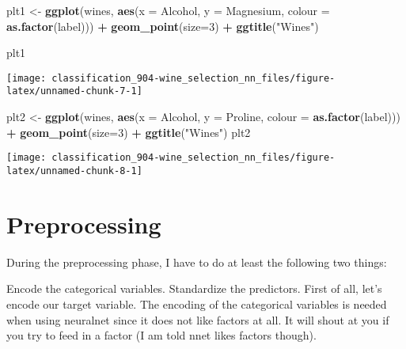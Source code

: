 \documentclass[]{book}
\newenvironment{Shaded}{\begin{snugshade}}{\end{snugshade}}
\newcommand{\DataTypeTok}[1]{\textcolor[rgb]{0.13,0.29,0.53}{#1}}
\newcommand{\DecValTok}[1]{\textcolor[rgb]{0.00,0.00,0.81}{#1}}
\newcommand{\KeywordTok}[1]{\textcolor[rgb]{0.13,0.29,0.53}{\textbf{#1}}}
\newcommand{\NormalTok}[1]{#1}
\newcommand{\OperatorTok}[1]{\textcolor[rgb]{0.81,0.36,0.00}{\textbf{#1}}}
\newcommand{\StringTok}[1]{\textcolor[rgb]{0.31,0.60,0.02}{#1}}
\begin{document}
\begin{Shaded}
\begin{Highlighting}[]
\NormalTok{plt1 <-}\StringTok{ }\KeywordTok{ggplot}\NormalTok{(wines, }\KeywordTok{aes}\NormalTok{(}\DataTypeTok{x =}\NormalTok{ Alcohol, }\DataTypeTok{y =}\NormalTok{ Magnesium, }\DataTypeTok{colour =} \KeywordTok{as.factor}\NormalTok{(label))) }\OperatorTok{+}
\StringTok{    }\KeywordTok{geom_point}\NormalTok{(}\DataTypeTok{size=}\DecValTok{3}\NormalTok{) }\OperatorTok{+}
\StringTok{    }\KeywordTok{ggtitle}\NormalTok{(}\StringTok{"Wines"}\NormalTok{)}

\NormalTok{plt1}
\end{Highlighting}
\end{Shaded}

\begin{center}\texttt{[image: classification\_904-wine\_selection\_nn\_files/figure-latex/unnamed-chunk-7-1]} \end{center}

\begin{Shaded}
\begin{Highlighting}[]
\NormalTok{plt2 <-}\StringTok{ }\KeywordTok{ggplot}\NormalTok{(wines, }\KeywordTok{aes}\NormalTok{(}\DataTypeTok{x =}\NormalTok{ Alcohol, }\DataTypeTok{y =}\NormalTok{ Proline, }\DataTypeTok{colour =} \KeywordTok{as.factor}\NormalTok{(label))) }\OperatorTok{+}
\StringTok{    }\KeywordTok{geom_point}\NormalTok{(}\DataTypeTok{size=}\DecValTok{3}\NormalTok{) }\OperatorTok{+}
\StringTok{    }\KeywordTok{ggtitle}\NormalTok{(}\StringTok{"Wines"}\NormalTok{)}
\NormalTok{plt2}
\end{Highlighting}
\end{Shaded}

\begin{center}\texttt{[image: classification\_904-wine\_selection\_nn\_files/figure-latex/unnamed-chunk-8-1]} \end{center}

\hypertarget{preprocessing}{%
\section{Preprocessing}\label{preprocessing}}

During the preprocessing phase, I have to do at least the following two things:

Encode the categorical variables.
Standardize the predictors.
First of all, let's encode our target variable. The encoding of the categorical variables is needed when using neuralnet since it does not like factors at all. It will shout at you if you try to feed in a factor (I am told nnet likes factors though).
\end{document}
